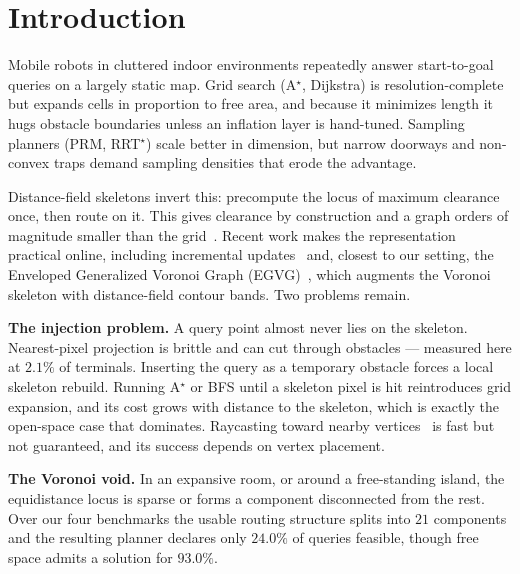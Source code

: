 \documentclass[conference]{IEEEtran}
\begin{document}
\section{Introduction}

Mobile robots in cluttered indoor environments repeatedly answer start-to-goal queries on a largely static map. Grid search (A$^\star$, Dijkstra) is resolution-complete but expands cells in proportion to free area, and because it minimizes length it hugs obstacle boundaries unless an inflation layer is hand-tuned. Sampling planners (PRM, RRT$^\star$) scale better in dimension, but narrow doorways and non-convex traps demand sampling densities that erode the advantage.

Distance-field skeletons invert this: precompute the locus of maximum clearance once, then route on it. This gives clearance by construction and a graph orders of magnitude smaller than the grid~\cite{lau2013,oleynikova2018,qi2022pruned}. Recent work makes the representation practical online, including incremental updates~\cite{lau2013} and, closest to our setting, the Enveloped Generalized Voronoi Graph (EGVG)~\cite{qi2025egvg}, which augments the Voronoi skeleton with distance-field contour bands. Two problems remain.

\textbf{The injection problem.} A query point almost never lies on the skeleton. Nearest-pixel projection is brittle and can cut through obstacles --- measured here at $2.1\%$ of terminals. Inserting the query as a temporary obstacle forces a local skeleton rebuild. Running A$^\star$ or BFS until a skeleton pixel is hit reintroduces grid expansion, and its cost grows with distance to the skeleton, which is exactly the open-space case that dominates. Raycasting toward nearby vertices~\cite{qi2025egvg} is fast but not guaranteed, and its success depends on vertex placement.

\textbf{The Voronoi void.} In an expansive room, or around a free-standing island, the equidistance locus is sparse or forms a component disconnected from the rest. Over our four benchmarks the usable routing structure splits into $21$ components and the resulting planner declares only $24.0\%$ of queries feasible, though free space admits a solution for $93.0\%$.
\end{document}
